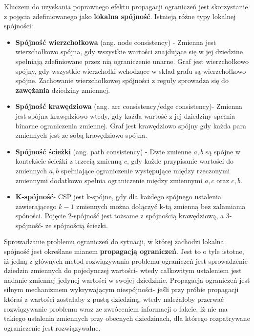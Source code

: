     Kluczem do uzyskania poprawnego efektu propagacji ograniczeń jest skorzystanie z pojęcia zdefiniowanego jako \textbf{lokalna spójność}.
    Istnieją różne typy lokalnej spójności:
    \begin{itemize}
        \item \textbf{Spójność wierzchołkowa} (ang. node consistency) - Zmienna jest wierzchołkowo spójna, 
        gdy wszystkie wartości znajdujące się w jej dziedzine spełniają zdefiniowane przez nią ograniczenie unarne.
        Graf jest wierzchołkowo spójny, gdy wszystkie wierzchołki wchodzące w skład grafu są wierzchołkowo spójne.
        Zachowanie wierzchołkowej spójności z reguły sprowadza się do \textbf{zawężania} dziedziny zmiennej.
        \item \textbf{Spójność krawędziowa} (ang. arc consistency/edge consistency)- Zmienna jest spójna krawędziowo wtedy, 
        gdy każda wartość z jej dziedziny spełnia binarne ograniczenia zmiennej. Graf jest krawędziowo spójny gdy każda para 
        zmiennych jest ze sobą krawędziowo spójna.
        \item \textbf{Spójność ścieżki} (ang. path consistency) - Dwie zmienne $a,b$ są spójne w kontekście ścieżki z trzecią zmienną 
        $c$, gdy każde przypisanie wartości do zmiennych $a,b$ spełniające ograniczenie występujące między rzeczonymi zmiennymi dodatkowo 
        spełnia ograniczenie między zmiennymi $a,c$ oraz $c,b$.
        \item \textbf{K-spójność}- CSP jest k-spójne, gdy dla każdego spójnego ustalenia zawierającego $k-1$ zmiennych można dołączyć k-tą zmienną 
        bez załamiania spóności. Pojęcie 2-spójność jest tożsame z spójnością krawędziową, a 3-spójność- ze spójnością ścieżki.
    \end{itemize}

    Sprowadzanie problemu ograniczeń do sytuacji, w której zachodzi lokalna spójność jest określane mianem \textbf{propagacją ograniczeń}. 
    Jest to o tyle istotne, iż jedną z głównych metod rozwiązywania problemu ograniczeń jest sprowadzenie dziedzin zmiennych do pojedynczej wartości- 
    wtedy całkowitym ustaleniem jest nadanie zmiennej jedynej wartości w swojej dziedzinie. Propagacja ograniczeń jest silnym mechanizmem wykrywającym 
    niespójności- jeśli przy próbie propagacji któraś z wartości zostałaby z pustą dziedziną, wtedy należałoby przerwać rozwiązywanie problemu wraz 
    ze zwróceniem informacji o fakcie, iż nie ma takiego ustalenia zmiennych przy obecnych dziedzinach, dla którego rozpatrywane ograniczenie 
    jest rozwiązywalne.

